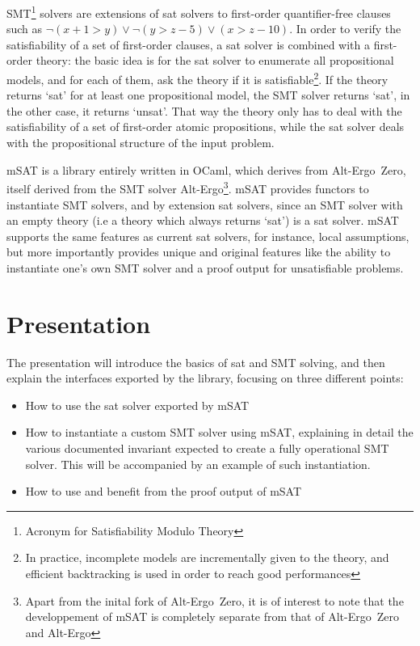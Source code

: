 \documentclass{llncs}
\def\aez{\textsf{Alt-Ergo~Zero}}
\def\altergo{\textsf{Alt-Ergo}}
\def\msat{\textsf{mSAT}}
\begin{document}
SMT\footnote{Acronym for Satisfiability Modulo Theory} solvers are extensions
of sat solvers to first-order quantifier-free clauses such as
$\neg (x + 1 > y) \lor \neg (y > z - 5) \lor (x > z - 10)$. In order to verify
the satisfiability of a set of first-order clauses, a sat solver is combined
with a first-order theory: the basic idea is for the sat solver to enumerate
all propositional models, and for each of them, ask the theory if it is
satisfiable\footnote{In practice, incomplete models are incrementally given to
the theory, and efficient backtracking is used in order to reach good
performances}. If the theory returns `sat' for at least one propositional model,
the SMT solver returns `sat', in the other case, it returns `unsat'. That way
the theory only has to deal with the satisfiability of a set of first-order
atomic propositions, while the sat solver deals with the propositional structure
of the input problem.

\msat{}\cite{msat} is a library entirely written in OCaml, which derives from
\aez{}\cite{aez}, itself derived from the SMT solver
\altergo{}\cite{altergo}\footnote{Apart from the inital fork of \aez{}, it is of
interest to note that the developpement of \msat{} is completely separate from
that of \aez{} and \altergo{}}. \msat{} provides functors to instantiate SMT
solvers, and by extension sat solvers, since an SMT solver with an empty theory
(i.e a theory which always returns `sat') is a sat solver. \msat{} supports the
same features as current sat solvers, for instance, local assumptions, but more
importantly provides unique and original features like the ability to
instantiate one's own SMT solver and a proof output for unsatisfiable problems.

\section*{Presentation}

The presentation will introduce the basics of sat and SMT solving, and then
explain the interfaces exported by the library, focusing on three different
points:

\begin{itemize}
  \item How to use the sat solver exported by \msat{}
  \item How to instantiate a custom SMT solver using \msat{}, explaining in
    detail the various documented invariant expected to create a fully
    operational SMT solver. This will be accompanied by an example of such
    instantiation.
  \item How to use and benefit from the proof output of \msat{}
\end{itemize}
\end{document}
